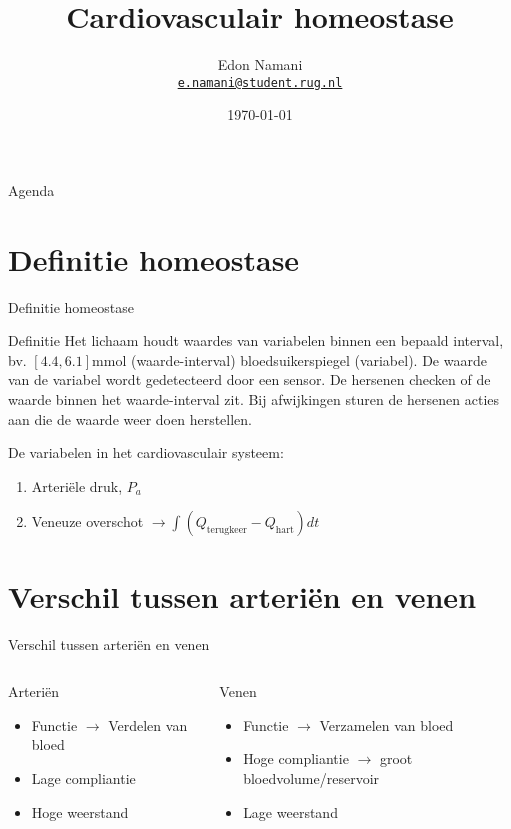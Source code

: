 \documentclass{beamer}
\title[Fysiologie]{Cardiovasculair homeostase}
\date{\today}
\author[Edon Namani, et. al]
{%
	Edon Namani\\
	\href{mailto:e.namani@student.rug.nl}{{\tt e.namani@student.rug.nl}}
}
\institute[%
	Faculteit Gezondheidswetenschappen\\
	Rijksuniversiteit Groningen\\
	Nederland
]
{%
	Faculteit Gezondheidswetenschappen\\
	Rijksuniversiteit Groningen\\
	Nederland

}
\begin{document}
{\aauwavesbg%
	\begin{frame}
	\titlepage
\end{frame}}

\begin{frame}{Agenda}{}
	\tableofcontents
\end{frame}
\section{Definitie homeostase}
\begin{frame}{Definitie homeostase}
    \begin{block}{Definitie}
        Het lichaam houdt waardes van variabelen binnen een bepaald interval, bv. $[4.4, 6.1] \si{\milli\mol}$ (waarde-interval) bloedsuikerspiegel (variabel). De waarde van de variabel wordt gedetecteerd door een sensor. De hersenen checken of de waarde binnen het waarde-interval zit. Bij afwijkingen sturen de hersenen acties aan die de waarde weer doen herstellen.

        De variabelen in het cardiovasculair systeem:
        \begin{enumerate}
            \item Arteriële druk, $P_a$
            \item Veneuze overschot $\rightarrow \int (Q_{\text{terugkeer}} - Q_{\text{hart}}) dt$
            \end{enumerate}
    \end{block}
\end{frame}
\section{Verschil tussen arteriën en venen}
\begin{frame}{Verschil tussen arteriën en venen}
    \begin{columns}
        \begin{block}{Arteriën}
            \begin{itemize}
                \item Functie $\rightarrow$ Verdelen van bloed
                \item Lage compliantie
                \item Hoge weerstand
            \end{itemize}
        \end{block}
    \begin{block}{Venen}
        \begin{itemize}
            \item Functie $\rightarrow$ Verzamelen van bloed
            \item Hoge compliantie $\rightarrow$ groot bloedvolume/reservoir
            \item Lage weerstand
        \end{itemize}
    \end{block}
    \end{columns}
\end{frame}
\end{document}
